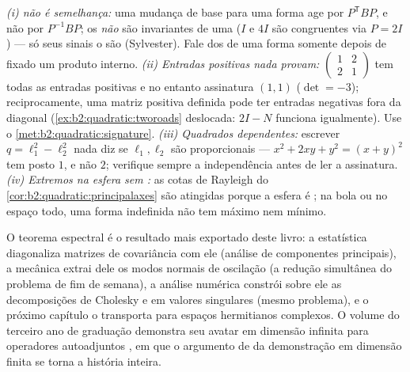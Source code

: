 \begin{remark}
\emph{(i)  não é semelhança:} uma mudança de base para
uma forma age por $P^{\mathsf T}BP$, e não por $P^{-1}BP$; os 
\emph{não} são invariantes de uma  ($I$ e $4I$
são congruentes via $P = 2I$) --- só seus sinais o são
(Sylvester). Fale dos  de uma forma somente depois de fixado um
produto interno. \emph{(ii) Entradas positivas nada provam:}
$\begin{pmatrix} 1 & 2\\ 2 & 1\end{pmatrix}$ tem todas as
entradas positivas e no entanto assinatura $(1,1)$ ($\det = -3$);
reciprocamente, uma matriz positiva definida pode ter entradas
negativas fora da diagonal (\cref{ex:b2:quadratic:tworoads} deslocada:
$2I - N$ funciona igualmente). Use o
\cref{met:b2:quadratic:signature}. \emph{(iii) Quadrados
dependentes:} escrever $q = \ell_1^2 - \ell_2^2$ nada diz se
$\ell_1, \ell_2$ são proporcionais --- $x^2 + 2xy + y^2 =
(x+y)^2$ tem posto $1$, e não $2$; verifique sempre a independência
antes de ler a assinatura. \emph{(iv) Extremos na esfera
sem :} as cotas de Rayleigh do
\cref{cor:b2:quadratic:principalaxes} são atingidas porque a
esfera é ; na bola  ou no espaço todo, uma
forma indefinida não tem máximo nem mínimo.
\end{remark}

\begin{remark}
O teorema espectral é o resultado mais exportado deste
livro: a estatística diagonaliza matrizes de covariância com ele
(análise de componentes principais), a mecânica extrai dele os modos normais
de oscilação (a redução simultânea do
problema de fim de semana), a análise numérica constrói sobre ele as decomposições
de Cholesky e em valores singulares (mesmo problema), e o próximo
capítulo o transporta para espaços hermitianos complexos. O volume do terceiro ano de
graduação demonstra seu avatar em dimensão infinita para operadores
autoadjuntos , em que o argumento de 
da demonstração em dimensão finita se torna a história inteira.
\end{remark}

